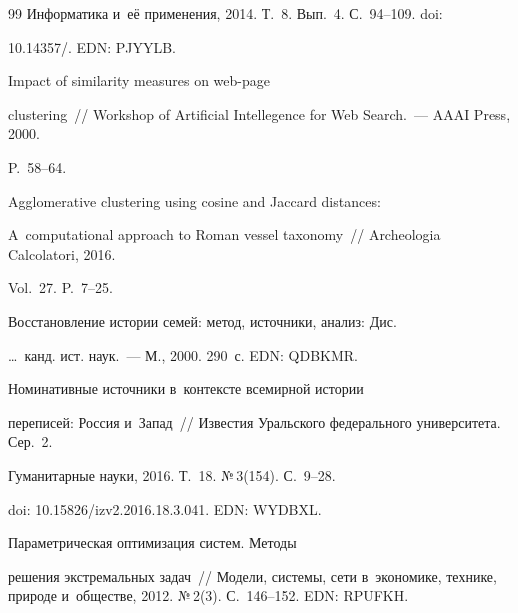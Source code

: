 {{\begin{thebibliography}{99}
Информатика и~её применения, 2014. Т.~8. Вып.~4. С.~94--109. doi: 


10.14357\!/. EDN: PJYYLB.




   Impact of similarity measures on web-page 


clustering~/\!\!/ Workshop of Artificial Intellegence for Web Search.~--- AAAI Press, 2000.  


P.~58--64.




   Agglomerative clustering using cosine and Jaccard distances: 


A~computational approach to Roman vessel taxonomy~/\!\!/ Archeologia Calcolatori, 2016. 


Vol.~27. P.~7--25.




   Восстановление истории семей: метод, источники, анализ: Дис.\ 


\ldots\ канд. ист. наук.~--- М., 2000. 290~с. EDN: QDBKMR.




   Номинативные источники в~контексте всемирной истории 


переписей: Россия и~Запад~/\!\!/ Известия Уральского федерального университета. Сер.~2. 


Гуманитарные науки, 2016. Т.~18. №\,3(154). С.~9--28. 


doi: 10.15826\!/\!izv2.2016.18.3.041. EDN: WYDBXL.




   Параметрическая оптимизация сис\-тем. Методы 


решения экстремальных задач~/\!\!/ Модели, сис\-те\-мы, сети в~экономике, технике, природе и~обществе, 2012. №\,2(3). С.~146--152. EDN: RPUFKH.


     \end{thebibliography}


} }











\vspace*{-6pt}





